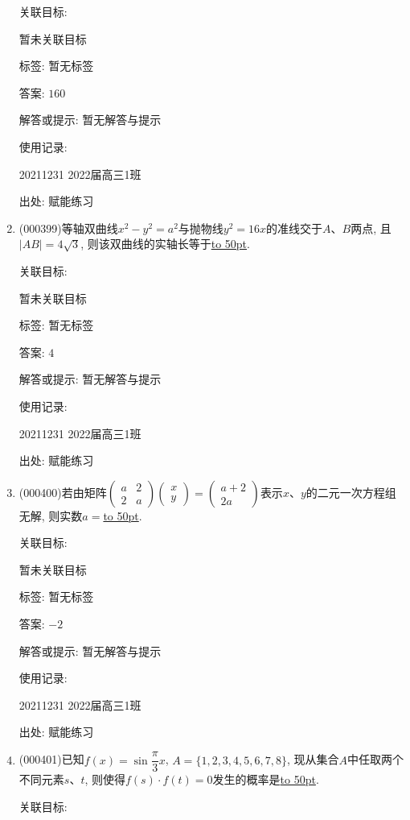 \documentclass[10pt,a4paper]{article}
\newcommand{\blank}[1]{\underline{\hbox to #1pt{}}}
\begin{document}
\begin{enumerate}[1.]
关联目标:

暂未关联目标



标签: 暂无标签

答案: $160$

解答或提示: 暂无解答与提示

使用记录:

20211231	2022届高三1班	


出处: 赋能练习
\item { (000399)}等轴双曲线$x^2-y^2=a^2$与抛物线$y^2=16x$的准线交于$A$、$B$两点, 且$|AB|=4\sqrt3$, 则该双曲线的实轴长等于\blank{50}.


关联目标:

暂未关联目标



标签: 暂无标签

答案: $4$

解答或提示: 暂无解答与提示

使用记录:

20211231	2022届高三1班	


出处: 赋能练习
\item { (000400)}若由矩阵$\begin{pmatrix}a & 2 \\ 2 & a\end{pmatrix}\begin{pmatrix}x \\ y\end{pmatrix}=\begin{pmatrix}a+2 \\ 2a\end{pmatrix}$表示$x$、$y$的二元一次方程组无解, 则实数$a=$\blank{50}.


关联目标:

暂未关联目标



标签: 暂无标签

答案: $-2$

解答或提示: 暂无解答与提示

使用记录:

20211231	2022届高三1班	


出处: 赋能练习
\item { (000401)}已知$f(x)=\sin\dfrac\pi 3x$, $A=\{1,2,3,4,5,6,7,8\}$, 现从集合$A$中任取两个不同元素$s$、$t$, 则使得$f(s)\cdot f(t)=0$发生的概率是\blank{50}.


关联目标:


\end{enumerate}
\end{document}
